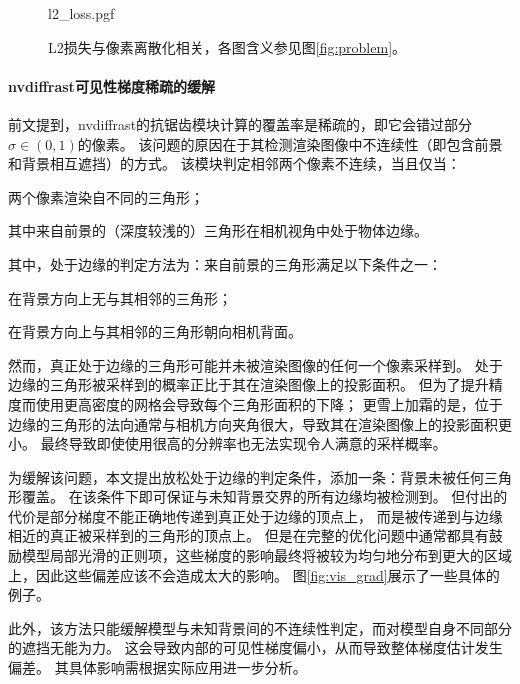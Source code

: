 \begin{figure}
    \centering
    {l2_loss.pgf}
    \caption[L2损失与像素离散化相关]{L2损失与像素离散化相关，各图含义参见图\ref{fig:problem}。}
    \label{fig:l2_loss}
\end{figure}

\paragraph{nvdiffrast可见性梯度稀疏的缓解}
前文提到，nvdiffrast的抗锯齿模块计算的覆盖率是稀疏的，即它会错过部分$\sigma\in(0,1)$的像素。
该问题的原因在于其检测渲染图像中不连续性（即包含前景和背景相互遮挡）的方式。
该模块判定相邻两个像素不连续，当且仅当：
\begin{enumerate*}
\item 两个像素渲染自不同的三角形；
\item 其中来自前景的（深度较浅的）三角形在相机视角中处于物体边缘。
\end{enumerate*}
其中，处于边缘的判定方法为：来自前景的三角形满足以下条件之一：
\begin{enumerate*}
\item 在背景方向上无与其相邻的三角形；
\item 在背景方向上与其相邻的三角形朝向相机背面。
\end{enumerate*}
然而，真正处于边缘的三角形可能并未被渲染图像的任何一个像素采样到。
处于边缘的三角形被采样到的概率正比于其在渲染图像上的投影面积。
但为了提升精度而使用更高密度的网格会导致每个三角形面积的下降；
更雪上加霜的是，位于边缘的三角形的法向通常与相机方向夹角很大，导致其在渲染图像上的投影面积更小。
最终导致即使使用很高的分辨率也无法实现令人满意的采样概率。

为缓解该问题，本文提出放松处于边缘的判定条件，添加一条：背景未被任何三角形覆盖。
在该条件下即可保证与未知背景交界的所有边缘均被检测到。
但付出的代价是部分梯度不能正确地传递到真正处于边缘的顶点上，
而是被传递到与边缘相近的真正被采样到的三角形的顶点上。
但是在完整的优化问题中通常都具有鼓励模型局部光滑的正则项，这些梯度的影响最终将被较为均匀地分布到更大的区域上，因此这些偏差应该不会造成太大的影响。
图\ref{fig:vis_grad}展示了一些具体的例子。

此外，该方法只能缓解模型与未知背景间的不连续性判定，而对模型自身不同部分的遮挡无能为力。
这会导致内部的可见性梯度偏小，从而导致整体梯度估计发生偏差。
其具体影响需根据实际应用进一步分析。

